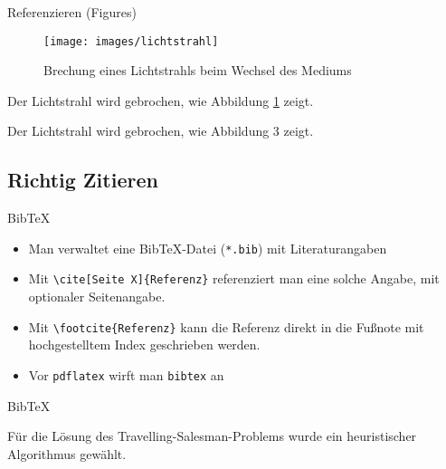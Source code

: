 \documentclass{beamer}
\begin{document}

		\begin{frame}[containsverbatim]{Referenzieren (Figures)}
			\begin{latexcode}
\begin{figure}[t]
	\texttt{[image: images/lichtstrahl]}
	\caption{Brechung eines Lichtstrahls beim Wechsel
			 des Mediums}
	\label{fig:lichtbrechung}
\end{figure}
Der Lichtstrahl wird gebrochen, wie
Abbildung \ref{fig:lichtbrechung} zeigt.
			\end{latexcode}

			Der Lichtstrahl wird gebrochen, wie Abbildung 3 zeigt.
		\end{frame}


		\subsection{Richtig Zitieren}

		\begin{frame}[containsverbatim]{Bib\TeX}
			\begin{itemize}
				\item Man verwaltet eine Bib\TeX{}-Datei (\texttt{*.bib}) mit Literaturangaben
				\item Mit \texttt{\textbackslash{}cite[Seite X]\{Referenz\}} referenziert man eine solche Angabe, mit optionaler Seitenangabe.
				\item Mit \texttt{\textbackslash{}footcite\{Referenz\}} kann die Referenz direkt in die Fußnote mit hochgestelltem Index geschrieben werden.
				\item Vor \texttt{pdflatex} wirft man \texttt{bibtex} an
			\end{itemize}
		\end{frame}


		\begin{frame}[containsverbatim]{Bib\TeX}
			\begin{latexcode}


Für die Lösung des Travelling-Salesman-Problems
wurde ein heuristischer Algorithmus \cite{lin19973}
gewählt.


			\end{latexcode}
		\end{frame}
\end{document}
